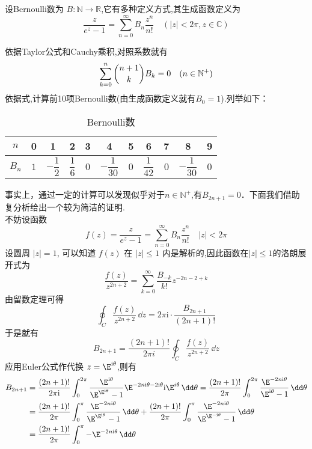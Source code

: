 \begin{definition}{}
设Bernoulli数为 $B:\mathbb{N}\to\mathbb{R} $,它有多种定义方式,其生成函数定义为
\begin{equation}{}
    \frac{z}{e^{z}-1}=\sum_{n=0}^{\infty}B_{n}\frac{z^{n}}{n!}
    \quad(|z|<2\pi,z\in{\mathbb C})
\end{equation}
\end{definition}
依据Taylor公式和Cauchy乘积,对照系数就有
\begin{equation}
    \sum_{k=0}^{n}\dbinom{n+1}{k}B_{k}=0\quad(n\in{\mathbb N^{+}})
\end{equation}
依据式,计算前10项Bernoulli数(由生成函数定义就有$B_{0}=1$).列举如下：
\begin{table}[ht]
\centering
\caption{Bernoulli数}
\begin{tabular}{|c|c|c|c|c|c|c|c|c|c|c|}
\hline
$ n $ & 0 & 1 & 2 & 3 & 4 & 5 & 6 & 7 & 8 & 9\\ 
\hline
$ B_{n} $ & $1$ & $-\dfrac{1}{2}$ & $ \dfrac{1}{6}$ & $0$ & $-\dfrac{1}{30}$ & $0$ & $\dfrac{1}{42}$ & $0$ & $-\dfrac{1}{30}$ & $0$\\
\hline
\end{tabular}
\end{table}
事实上，通过一定的计算可以发现似乎对于$n\in\mathbb N^+$,有$B_{2n+1}=0$．下面我们借助复分析给出一个较为简洁的证明.\\
不妨设函数
\[
f(z)=\frac{z}{e^{z}-1}=\sum_{n=0}^{\infty} B_{n} \frac{z^{n}}{n !}\quad |z|<2\pi
\]
设圆周 $|z|=1$, 可以知道 $f(z)$ 在 $|z|\leq 1$ 内是解析的,因此函数在$|z|\leq 1$的洛朗展开式为
\[
\frac{f(z)}{z^{2n+2}}=\sum_{k=0}^{\infty}\frac{B_{-k}}{k!}{z^{-2n-2+k}}
\]
由留数定理可得
\[
\oint_{C}\frac{f(z)}{z^{2 n+2}}\,\dd z=2\pi\mathrm i\cdot\frac{B_{2 n+1}}{(2n+1)!}
\]
于是就有
\[
B_{2n+1}=\frac{(2n+1) !}{2 \pi i}\oint_{C} \frac{f(z)}{z^{2 n+2}}\,\dd z
\]
应用Euler公式作代换 $z=\E^{\mathrm i\theta}$,则有
$$
\begin{aligned}
B_{2n+1}&=\frac{(2n+1)!}{2\pi\mathrm i}\int_{0}^{2\pi}\frac{\E^{\mathrm i\theta}}{\E^{\E^{\mathrm i\theta}}-1}\E^{-2n\mathrm i\theta-2\mathrm i\theta}\mathrm i\E^{i \theta}\,\dd\theta
=\frac{(2n+1)!}{2\pi}\int_{0}^{2\pi}\frac{\E^{-2n\mathrm i\theta}}{\E^{\mathrm i\theta}-1}\,\dd\theta\\
&=\frac{(2n+1)!}{2\pi}\int_{0}^{\pi}\frac{\E^{-2n\mathrm i\theta}}{\E^{\E^{\mathrm i\theta}}-1}\,\dd \theta+\frac{(2n+1)!}{2\pi}\int_{0}^{\pi} \frac{\E^{-2n\mathrm i\theta}}{\E^{\E^{-\mathrm i\theta}}-1}\,\dd \theta\\
&=\frac{(2 n+1)!}{2\pi}\int_{0}^{\pi}-\E^{-2n\mathrm i\theta}\,\dd\theta
\end{aligned}
$$
